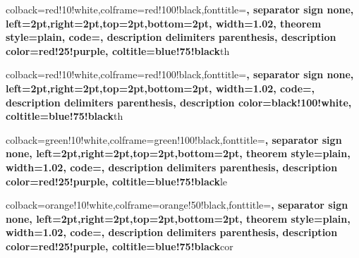 \usepackage[utf8]{inputenc}
\usepackage[T1]{fontenc}
\usepackage{lmodern}
\usepackage{amsmath, amssymb}
\usepackage{graphicx}
\usepackage{hyperref}
\usepackage{geometry}
\usepackage{fancyhdr}
\usepackage{enumitem}
\usepackage{listings}
\usepackage{xcolor}
\usepackage{algorithm2e}
\usepackage{algorithmicx}
\usepackage{tcolorbox}
\usepackage{amsmath}
\usepackage{amsthm}
\usepackage{amsfonts}
\usepackage{amssymb}
\usepackage{setspace}
\usepackage{footnote}





%
{colback=red!10!white,colframe=red!100!black,fonttitle=\bfseries, separator sign none,
left=2pt,right=2pt,top=2pt,bottom=2pt,
width=1.02\linewidth,
theorem style=plain,
code={\onehalfspacing},
description delimiters parenthesis, description color=red!25!purple,
coltitle=blue!75!black}{th}

%
{colback=red!10!white,colframe=red!100!black,fonttitle=\bfseries, separator sign none,
left=2pt,right=2pt,top=2pt,bottom=2pt,
width=1.02\linewidth,
code={\onehalfspacing},
description delimiters parenthesis, description color=black!100!white,
coltitle=blue!75!black}{th}


%
{colback=green!10!white,colframe=green!100!black,fonttitle=\bfseries, separator sign none,
left=2pt,right=2pt,top=2pt,bottom=2pt,
theorem style=plain,
width=1.02\linewidth,
code={\onehalfspacing},
description delimiters parenthesis, description color=red!25!purple,
coltitle=blue!75!black}{le}

%
{colback=orange!10!white,colframe=orange!50!black,fonttitle=\bfseries, separator sign none,
left=2pt,right=2pt,top=2pt,bottom=2pt,
theorem style=plain,
width=1.02\linewidth,
code={\onehalfspacing},
description delimiters parenthesis, description color=red!25!purple,
coltitle=blue!75!black}{cor}


